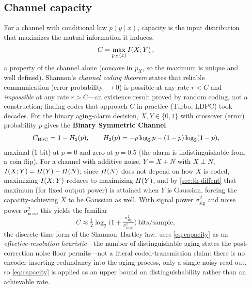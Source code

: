 \subsection{Channel capacity}
\label{sec:th-capacity}
For a channel with conditional law $p(y\mid x)$, capacity is the input
distribution that maximizes the mutual information it induces,
\begin{equation}
  C = \max_{p_X(x)} I\!\left(X ; Y\right),
  \label{eq:capacity-def}
\end{equation}
a property of the channel alone (concave in $p_X$, so the maximum is unique and
well defined). Shannon's \emph{channel coding theorem} states that reliable
communication (error probability $\to0$) is possible at any rate $r<C$ and
\emph{impossible} at any rate $r>C$---an existence result proved by random
coding, not a construction; finding codes that approach $C$ in practice (Turbo,
LDPC) took decades. For the binary aging-alarm decision, $X,Y\in\{0,1\}$ with
crossover (error) probability $p$ gives the \textbf{Binary Symmetric Channel}
\begin{equation}
  C_{\mathrm{BSC}} = 1 - H_2(p), \qquad H_2(p) = -p\log_2 p - (1-p)\log_2(1-p),
  \label{eq:bsc}
\end{equation}
maximal ($1$ bit) at $p=0$ and zero at $p=0.5$ (the alarm is indistinguishable
from a coin flip). For a channel with additive noise, $Y=X+N$ with $X\perp N$,
$I\!\left(X ; Y\right)=H\!\left(Y\right)-H\!\left(N\right)$; since $H\!\left(N\right)$ does not depend on how $X$ is
coded, maximizing $I\!\left(X ; Y\right)$ reduces to maximizing $H\!\left(Y\right)$, and by
\cref{sec:th-diffent} that maximum (for fixed output power) is attained when $Y$
is Gaussian, forcing the capacity-achieving $X$ to be Gaussian as well. With
signal power $\sigma^2_{\text{sig}}$ and noise power $\sigma^2_{\text{noise}}$
this yields the familiar
\begin{equation}
  C \approx \tfrac{1}{2}\log_2\!\Big(1+\tfrac{\sigma^2_{\text{sig}}}{\sigma^2_{\text{noise}}}\Big)\ \text{bits/sample},
  \label{eq:capacity}
\end{equation}
the discrete-time form of the Shannon--Hartley law.  uses
\cref{eq:capacity} as an \emph{effective-resolution heuristic}---the number of
distinguishable aging states the post-correction noise floor permits---not a
literal coded-transmission claim: there is no encoder inserting redundancy into
the aging process, only a single noisy read-out, so \cref{eq:capacity} is
applied as an upper bound on distinguishability rather than an achievable rate.

